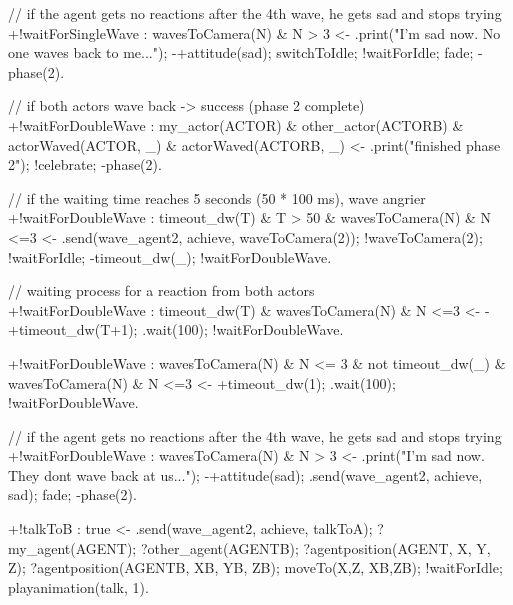 \documentclass[draft,final]{vutinfth} %
\begin{document}
{// if the agent gets no reactions after the 4th wave, he gets sad and stops trying\\
+!waitForSingleWave : wavesToCamera(N) \& N > 3
                    <-  .print("I'm sad now. No one waves back to me...");
                        -+attitude(sad);
                        switchToIdle;
                        !waitForIdle;
                        fade;
                        -phase(2).

// if both actors wave back -> success (phase 2 complete)\\
+!waitForDoubleWave : my\_actor(ACTOR) \& other\_actor(ACTORB) \&
                        actorWaved(ACTOR, \_) \& actorWaved(ACTORB, \_)
                    <-  .print("finished phase 2");
                        !celebrate;
                        -phase(2).

// if the waiting time reaches 5 seconds (50 * 100 ms), wave angrier\\
+!waitForDoubleWave : timeout\_dw(T) \& T > 50 \& wavesToCamera(N) \& N <=3
                    <-  .send(wave\_agent2, achieve, waveToCamera(2));
                        !waveToCamera(2);
                        !waitForIdle;
                        -timeout\_dw(\_);
                        !waitForDoubleWave.

// waiting process for a reaction from both actors\\
+!waitForDoubleWave : timeout\_dw(T) \& wavesToCamera(N) \& N <=3
                    <-  -+timeout\_dw(T+1);
                        .wait(100);
                        !waitForDoubleWave.

+!waitForDoubleWave : wavesToCamera(N) \& N <= 3 \& not timeout\_dw(\_) \& wavesToCamera(N) \& N <=3
                    <-  +timeout\_dw(1);
                        .wait(100);
                        !waitForDoubleWave.

// if the agent gets no reactions after the 4th wave, he gets sad and stops trying\\
+!waitForDoubleWave : wavesToCamera(N) \& N > 3
                    <-  .print("I'm sad now. They dont wave back at us...");
                        -+attitude(sad);
                        .send(wave\_agent2, achieve, sad);
                        fade;
                        -phase(2).

+!talkToB : true
                    <-  .send(wave\_agent2, achieve, talkToA);
                        ?my\_agent(AGENT);
                        ?other\_agent(AGENTB);
                        ?agentposition(AGENT, X, Y, Z);
                        ?agentposition(AGENTB, XB, YB, ZB);
                        moveTo(X,Z, XB,ZB);
                        !waitForIdle;
                        playanimation(talk, 1).

}
\end{document}
